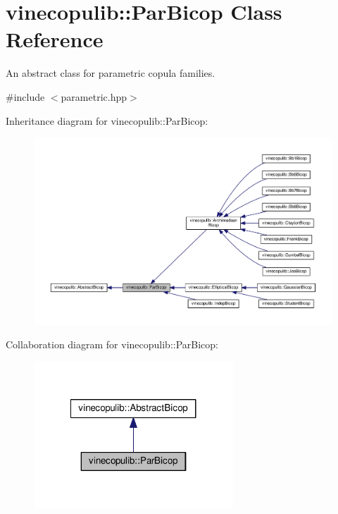 \hypertarget{classvinecopulib_1_1_par_bicop}{\section{vinecopulib\+:\+:Par\+Bicop Class Reference}
\label{classvinecopulib_1_1_par_bicop}
}


An abstract class for parametric copula families.  




{\ttfamily \#include $<$parametric.\+hpp$>$}



Inheritance diagram for vinecopulib\+:\+:Par\+Bicop\+:\nopagebreak
\begin{figure}[H]
\begin{center}
\leavevmode
\includegraphics[width=350pt]{classvinecopulib_1_1_par_bicop__inherit__graph}
\end{center}
\end{figure}


Collaboration diagram for vinecopulib\+:\+:Par\+Bicop\+:\nopagebreak
\begin{figure}[H]
\begin{center}
\leavevmode
\includegraphics[width=212pt]{classvinecopulib_1_1_par_bicop__coll__graph}
\end{center}
\end{figure}
